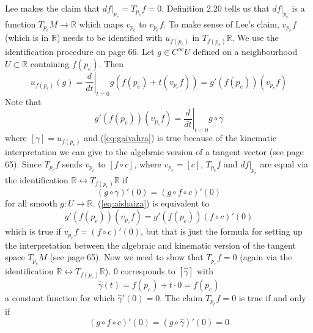 \documentclass[12pt]{article}
\begin{document}
Lee makes the claim that $df|_{p_{e}}=T_{p_{e}}f=0$. Definition 2.20
  tells us that $df|_{p_{e}}$ is a function
  $T_{p_{e}}M\rightarrow\mathbb{R}$ which maps $v_{p_{e}}$ to
  $v_{p_{e}}f$. To make sense of Lee's claim, $v_{p_{e}}f$ (which is
  in $\mathbb{R}$) needs to be identified with $u_{f(p_{e})}$ in
  $T_{f(p_{e})}\mathbb{R}$. We use the identification procedure on
  page 66. Let $g\in{}C^{\infty}U$ defined on a neighbourhood
  $U\subset\mathbb{R}$ containing $f(p_{e})$. Then 
  \begin{equation}
    \label{eq:zooxohgh}
    u_{f(p_{e})}(g)=\left.\frac{d}{dt}\right\vert_{t=0}g(f(p_{e})+t(v_{p_{e}}f))=g'(f(p_{e}))(v_{p_{e}}f)
  \end{equation}
Note that
\begin{equation}
  \label{eq:gaivahra}
  g'(f(p_{e}))(v_{p_{e}}f)=\left.\frac{d}{dt}\right\vert_{t=0}g\circ{}\gamma
\end{equation}
where $[\gamma]=u_{f(p_{e})}$ and (\ref{eq:gaivahra}) is true because
of the kinematic interpretation we can give to the algebraic version
of a tangent vector (see page 65). Since $T_{p_{e}}f$ sends
$v_{p_{e}}$ to $[f\circ{}c]$, where $v_{p_{e}}=[c]$, $T_{p_{e}}f$ and
$df|_{p_{e}}$ are equal via the identification
$\mathbb{R}\leftrightarrow{}T_{f(p_{e})}\mathbb{R}$ if
\begin{equation}
  \label{eq:aishaiza}
  (g\circ\gamma)'(0)=(g\circ{}f\circ{}c)'(0)
\end{equation}
for all smooth $g:U\rightarrow\mathbb{R}$. (\ref{eq:aishaiza}) is
equivalent to
\begin{equation}
  \label{eq:iegahnon}
g'(f(p_{e}))(v_{p_{e}}f)=g'(f(p_{e}))(f\circ{}c)'(0)
\end{equation}
which is true if $v_{p_{e}}f=(f\circ{}c)'(0)$, but that is just the
formula for setting up the interpretation between the algebraic and
kinematic version of the tangent space $T_{p_{e}}M$ (see page 65). Now
we need to show that $T_{p_{e}}f=0$ (again via the identification
$\mathbb{R}\leftrightarrow{}T_{f(p_{e})}\mathbb{R}$). $0$ corresponds
to $[\hat{\gamma}]$ with
\begin{equation}
  \label{eq:quietoph}
  \hat{\gamma}(t)=f(p_{e})+t\cdot{}0=f(p_{e})
\end{equation}
a constant function for which $\hat{\gamma}'(0)=0$. The claim
$T_{p_{e}}f=0$ is true if and only if
\begin{equation}
  \label{eq:aimeceij}
  (g\circ{}f\circ{}c)'(0)=(g\circ\hat{\gamma})'(0)=0
\end{equation}
\end{document}
